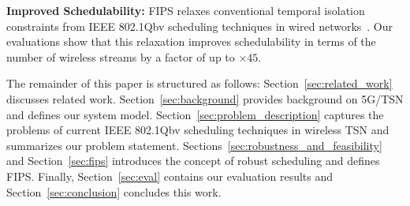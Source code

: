 \textbf{Improved Schedulability:} 
FIPS relaxes conventional temporal isolation constraints from IEEE 802.1Qbv scheduling techniques in wired networks~\cite{nwps,Craciunas2016RTNS}.
Our evaluations show that this relaxation improves schedulability in terms of the number of wireless streams by a factor of up to $\times 45$.

The remainder of this paper is structured as follows: 
Section~\ref{sec:related_work} discusses related work.
Section~\ref{sec:background} provides background on 5G/TSN and defines our system model.
Section~\ref{sec:problem_description} captures the problems of current IEEE 802.1Qbv scheduling techniques in wireless TSN and summarizes our problem statement.
Sections~\ref{sec:robustness_and_feasibility} and Section~\ref{sec:fips} introduces the concept of robust scheduling and defines FIPS.
Finally, Section~\ref{sec:eval} contains our evaluation results and Section~\ref{sec:conclusion} concludes this work.

